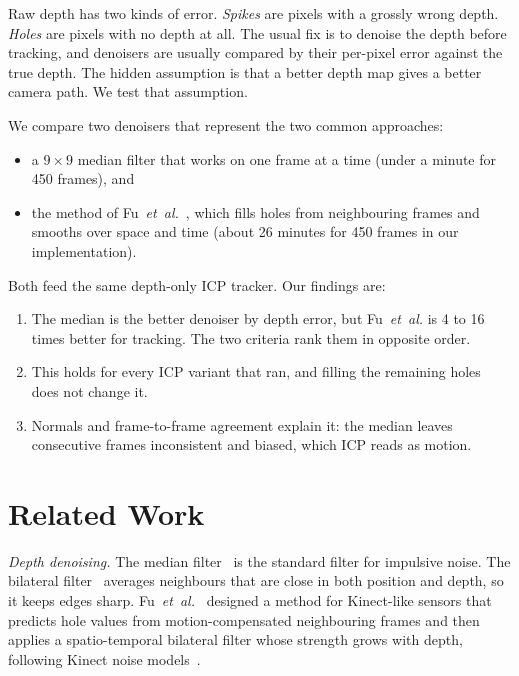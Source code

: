 \documentclass[conference]{IEEEtran}
\newcommand{\fu}{Fu~\emph{et~al.}}
\begin{document}
Raw depth has two kinds of error. \emph{Spikes} are
pixels with a grossly wrong depth. \emph{Holes} are pixels with no depth at
all. The usual fix is to denoise the depth before tracking, and denoisers are
usually compared by their per-pixel error against the true depth. The hidden
assumption is that a better depth map gives a better camera path. We test
that assumption.

We compare two denoisers that represent the two common approaches:
\begin{itemize}
\item a $9\times9$ median filter that works on one frame at a time
      (under a minute for 450 frames), and
\item the method of \fu{}~\cite{fu2012kinect}, which fills holes from
      neighbouring frames and smooths over space and time (about 26 minutes
      for 450 frames in our implementation).
\end{itemize}
Both feed the same depth-only ICP tracker. Our findings are:
\begin{enumerate}
\item The median is the better denoiser by depth error, but \fu{} is 4 to 16
      times better for tracking. The two criteria rank them in opposite order.
\item This holds for every ICP variant that ran, and filling the remaining
      holes does not change it.
\item Normals and frame-to-frame agreement explain it: the median leaves
      consecutive frames inconsistent and biased, which ICP reads as motion.
\end{enumerate}

\section{Related Work}

\emph{Depth denoising.} The median filter~\cite{huang1979fast} is the standard
filter for impulsive noise. The bilateral filter~\cite{tomasi1998bilateral}
averages neighbours that are close in both position and depth, so it keeps
edges sharp. \fu{}~\cite{fu2012kinect} designed a method for Kinect-like
sensors that predicts hole values from motion-compensated neighbouring frames
and then applies a spatio-temporal bilateral filter whose strength grows with
depth, following Kinect noise models~\cite{khoshelham2012accuracy,nguyen2012modeling}.
\end{document}
